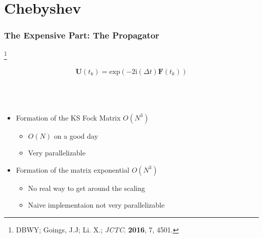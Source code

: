 \documentclass{beamer}
\newcommand{\bpar}[1]{\left( #1 \right)}                  %
\renewcommand{\exp}[1]{\mathrm{exp}\bpar{#1}}
\newcommand\blfootnote[1]{%
  \begingroup
  \renewcommand\thefootnote{}\footnote{#1}%
  \addtocounter{footnote}{-1}%
  \endgroup
}
\begin{document}
\section{Chebyshev}

\begin{frame}
\frametitle{The Expensive Part: The Propagator}
\blfootnote{DBWY; Goings, J.J; Li. X.; \emph{JCTC}. \textbf{2016}, 7, 4501.}
{ \LARGE
\begin{equation*}
\mathbf{U}(t_k) = \exp{-2\mathrm{i}(\Delta t) \mathbf{F}(t_k)}
\end{equation*}
}
~\\
~\\
~\\


\begin{itemize}
  \item Formation of the KS Fock Matrix $O(N^3)$
  \begin{itemize}
    \normalsize
    \item $O(N)$ on a good day
    \item Very parallelizable
  \end{itemize}
  \item Formation of the matrix exponential $O(N^3)$
  \begin{itemize}
    \normalsize
    \item No real way to get around the scaling
    \item Naive implementaion not very parallelizable
  \end{itemize}
\end{itemize}

\end{frame}
\end{document}

